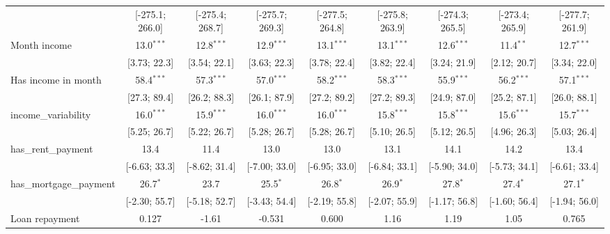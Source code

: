 \begin{table}[htbp]
\begin{threeparttable}[b]
\begin{tabular}{lcccccccc}
                                     & [-275.1; 266.0] & [-275.4; 268.7] & [-275.7; 269.3] & [-277.5; 264.8] & [-275.8; 263.9] & [-274.3; 265.5] & [-273.4; 265.9] & [-277.7; 261.9]\\   
         Month income                & 13.0$^{***}$    & 12.8$^{***}$    & 12.9$^{***}$    & 13.1$^{***}$    & 13.1$^{***}$    & 12.6$^{***}$    & 11.4$^{**}$     & 12.7$^{***}$\\   
                                     & [3.73; 22.3]    & [3.54; 22.1]    & [3.63; 22.3]    & [3.78; 22.4]    & [3.82; 22.4]    & [3.24; 21.9]    & [2.12; 20.7]    & [3.34; 22.0]\\   
         Has income in month         & 58.4$^{***}$    & 57.3$^{***}$    & 57.0$^{***}$    & 58.2$^{***}$    & 58.3$^{***}$    & 55.9$^{***}$    & 56.2$^{***}$    & 57.1$^{***}$\\   
                                     & [27.3; 89.4]    & [26.2; 88.3]    & [26.1; 87.9]    & [27.2; 89.2]    & [27.2; 89.3]    & [24.9; 87.0]    & [25.2; 87.1]    & [26.0; 88.1]\\   
         income\_variability         & 16.0$^{***}$    & 15.9$^{***}$    & 16.0$^{***}$    & 16.0$^{***}$    & 15.8$^{***}$    & 15.8$^{***}$    & 15.6$^{***}$    & 15.7$^{***}$\\   
                                     & [5.25; 26.7]    & [5.22; 26.7]    & [5.28; 26.7]    & [5.28; 26.7]    & [5.10; 26.5]    & [5.12; 26.5]    & [4.96; 26.3]    & [5.03; 26.4]\\   
         has\_rent\_payment          & 13.4            & 11.4            & 13.0            & 13.0            & 13.1            & 14.1            & 14.2            & 13.4\\   
                                     & [-6.63; 33.3]   & [-8.62; 31.4]   & [-7.00; 33.0]   & [-6.95; 33.0]   & [-6.84; 33.1]   & [-5.90; 34.0]   & [-5.73; 34.1]   & [-6.61; 33.4]\\   
         has\_mortgage\_payment      & 26.7$^{*}$      & 23.7            & 25.5$^{*}$      & 26.8$^{*}$      & 26.9$^{*}$      & 27.8$^{*}$      & 27.4$^{*}$      & 27.1$^{*}$\\   
                                     & [-2.30; 55.7]   & [-5.18; 52.7]   & [-3.43; 54.4]   & [-2.19; 55.8]   & [-2.07; 55.9]   & [-1.17; 56.8]   & [-1.60; 56.4]   & [-1.94; 56.0]\\   
         Loan repayment              & 0.127           & -1.61           & -0.531          & 0.600           & 1.16            & 1.19            & 1.05            & 0.765\\   

\end{tabular}
\end{threeparttable}
\end{table}
